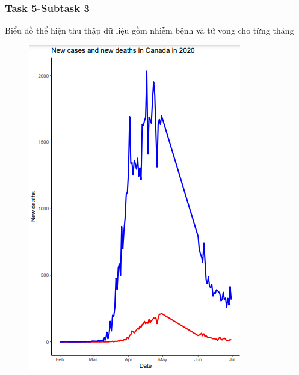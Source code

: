 \documentclass[english,10pt,table]{beamer}
\begin{document}
\frame
{
    \frametitle{Task 5-Subtask 3}
    \begin{block}{Biểu đồ thể hiện thu thập dữ liệu gồm nhiễm bệnh và tử vong cho từng tháng}
    \begin{figure}[H]
		\centering
		\includegraphics[scale=0.5]{images/5.3.1.png}
	\end{figure}
    \end{block}
}
\frame
\end{document}
